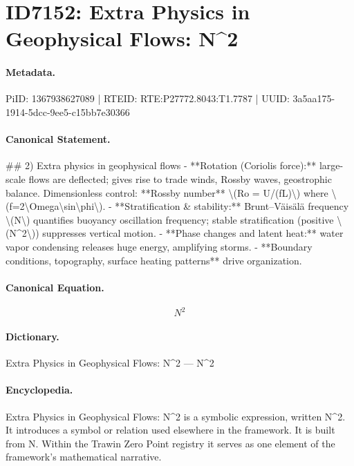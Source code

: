 \section*{ID7152: Extra Physics in Geophysical Flows: N\textasciicircum{}2}
\paragraph{Metadata.}
PiID: 1367938627089 | RTEID: RTE:P27772.8043:T1.7787 | UUID: 3a5aa175-1914-5dcc-9ee5-c15bb7e30366

\paragraph{Canonical Statement.}
\#\# 2) Extra physics in geophysical flows - **Rotation (Coriolis force):** large-scale flows are deflected; gives rise to trade winds, Rossby waves, geostrophic balance. Dimensionless control: **Rossby number** \textbackslash{}(Ro = U/(fL)\textbackslash{}) where \textbackslash{}(f=2\textbackslash{}Omega\textbackslash{}sin\textbackslash{}phi\textbackslash{}). - **Stratification \& stability:** Brunt–Väisälä frequency \textbackslash{}(N\textbackslash{}) quantifies buoyancy oscillation frequency; stable stratification (positive \textbackslash{}(N\textasciicircum{}2\textbackslash{})) suppresses vertical motion. - **Phase changes and latent heat:** water vapor condensing releases huge energy, amplifying storms. - **Boundary conditions, topography, surface heating patterns** drive organization.

\paragraph{Canonical Equation.}
\[
N^2
\]

\paragraph{Dictionary.}
Extra Physics in Geophysical Flows: N\textasciicircum{}2 — N\textasciicircum{}2

\paragraph{Encyclopedia.}
Extra Physics in Geophysical Flows: N\textasciicircum{}2 is a symbolic expression, written N\textasciicircum{}2. It introduces a symbol or relation used elsewhere in the framework. It is built from N. Within the Trawin Zero Point registry it serves as one element of the framework's mathematical narrative.
